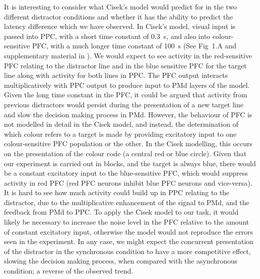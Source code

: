 \documentclass[10pt,letterpaper]{article}
\begin{document}
It is interesting to consider what Cisek's model would predict for in
the two different distractor conditions and whether it has the ability
to predict the latency difference which we have observed. In Cisek's
model, visual input is passed into PPC, with a short time constant of
0.3~s, and also into colour-sensitive PFC, with a much longer time
constant of 100~s (See Fig~1.A and supplementary material in
\cite{cisek_integrated_2006}). We would expect to see activity in the
red-sensitive PFC relating to the distractor line and in the blue
sensitive PFC for the target line along with activity for both lines
in PPC. The PFC output interacts multiplicatively with PPC output to
produce input to PMd layers of the model. Given the long time constant
in the PFC, it could be argued that activity from previous distractors
would persist during the presentation of a new target line and slow
the decision making process in PMd. However, the behaviour of PFC is
not modelled in detail in the Cisek model, and instead, the
determination of which colour refers to a target is made by providing
excitatory input to one colour-sensitive PFC population or the
other. In the Cisek modelling, this occurs on the presentation of the
colour code (a central red or blue circle). Given that our experiment
is carried out in blocks, and the target is always blue, there would
be a constant excitatory input to the blue-sensitive PFC, which would
suppress activity in red PFC (red PFC neurons inhibit blue PFC neurons
and vice-versa). It is hard to see how much activity could build up in
PPC relating to the distractor, due to the multiplicative enhancement
of the signal to PMd, and the feedback from PMd to PPC. To apply the
Cisek model to our task, it would likely be necessary to increase the
noise level in the PFC relative to the amount of constant excitatory
input, otherwise the model would not reproduce the errors seen in the
experiment. In any case, we might expect the concurrent presentation
of the distractor in the synchronous condition to have a more
competitive effect, slowing the decision making process, when compared
with the asynchronous condition; a reverse of the observed trend.
\end{document}
